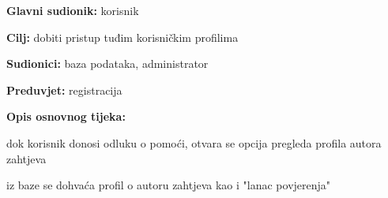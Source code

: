\begin{packed_item}
	
	\item \textbf{Glavni sudionik: }korisnik
	\item  \textbf{Cilj:} dobiti pristup tuđim korisničkim profilima
	\item  \textbf{Sudionici:} baza podataka, administrator
	\item  \textbf{Preduvjet:} registracija
	\item  \textbf{Opis osnovnog tijeka:}
	
	\item[] \begin{packed_enum}
		
		\item dok korisnik donosi odluku o pomoći, otvara se opcija pregleda profila autora zahtjeva
		\item iz baze se dohvaća profil o autoru zahtjeva kao i "lanac povjerenja"
	\end{packed_enum}
\end{packed_item}
\noindent {}
